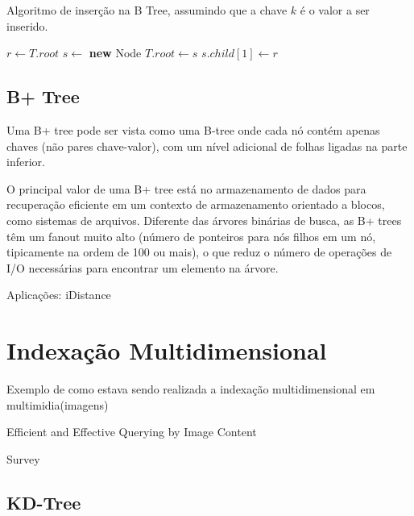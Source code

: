\begin{algorithm}
\caption{Algoritmo de inserção na B Tree, assumindo que a chave $k$ é o valor a ser inserido.}
\label{alg:btree_insertion}
\begin{algorithmic}[1]
    \State $r \gets T.root$
        \State $s \gets$ \textbf{new} Node
        \State $T.root \gets s$
        \State $s.child[1] \gets r$
        \State {}
        \State {}
    \Else
        \State {}
    \EndIf
\EndProcedure
\end{algorithmic}
\end{algorithm}

\cite{btree:wiki,btree:comer1979,btree:bayer1970}

\subsection{B+ Tree}

Uma B+ tree pode ser vista como uma B-tree onde cada nó contém apenas chaves (não pares chave-valor), com um nível adicional de folhas ligadas na parte inferior.

O principal valor de uma B+ tree está no armazenamento de dados para recuperação eficiente em um contexto de armazenamento orientado a blocos, como sistemas de arquivos. Diferente das árvores binárias de busca, as B+ trees têm um fanout muito alto (número de ponteiros para nós filhos em um nó, tipicamente na ordem de 100 ou mais), o que reduz o número de operações de I/O necessárias para encontrar um elemento na árvore.

Aplicações: iDistance

\cite{bptree:wiki}

\section{Indexação Multidimensional}
\label{sec:multidimsearch}

Exemplo de como estava sendo realizada a indexação multidimensional em multimidia(imagens)

Efficient and Effective Querying by Image Content

Survey \cite{multidimensionalmethods:gaede1998, searching:chavez2001}

\subsection{KD-Tree}

